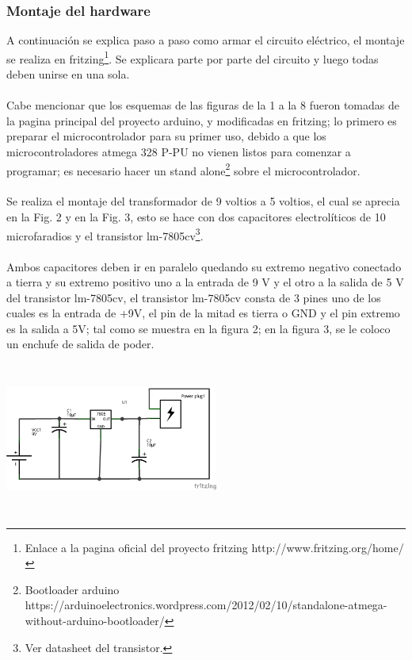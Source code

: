 \documentclass[12pt]{article}
\newenvironment{Figure}
{\par\medskip\noindent\minipage{\linewidth}}
{\endminipage\par\medskip}
\begin{document}
\begin{multicols}{2}
\subsubsection{Montaje del hardware}
A continuación se explica paso a paso como armar el circuito eléctrico, el montaje se realiza en fritzing\footnote{Enlace a la pagina oficial del proyecto fritzing http://www.fritzing.org/home/}. Se explicara parte por parte del circuito y luego todas deben unirse en una sola.
\\ \\
Cabe mencionar que los esquemas de las figuras de la 1 a la 8 fueron tomadas de la pagina principal del proyecto arduino, y modificadas en fritzing; lo primero es preparar el microcontrolador para su primer uso, debido a que los microcontroladores atmega 328 P-PU no vienen listos para comenzar a programar; es necesario hacer un stand alone\footnote{Bootloader arduino https://arduinoelectronics.wordpress.com/2012/02/10/standalone-atmega-without-arduino-bootloader/} sobre el microcontrolador.
\\ \\ 
Se realiza el montaje del transformador de 9 voltios a 5 voltios, el cual se aprecia en la Fig. 2 y en la Fig. 3, esto se hace con dos capacitores electrolíticos de 10 microfaradios  y el transistor lm-7805cv\footnote{ Ver datasheet del transistor.}.
\\ \\
Ambos  capacitores deben ir en paralelo quedando su extremo negativo conectado a tierra y su extremo positivo uno a la entrada de 9 V y el otro a la salida de 5 V del transistor lm-7805cv, el transistor lm-7805cv consta de 3 pines uno de los cuales es la entrada de +9V, el pin de la mitad es tierra o GND y el pin extremo es la salida a 5V; tal como se muestra en la figura 2; en la figura 3, se le coloco un enchufe de salida de poder.

\begin{Figure}
\center
\includegraphics[width=7cm, height=5cm]{fig/esquematrans.png} 
\label{fig:g2}
\end{Figure}
\vspace{0.2cm}


\end{multicols}
\end{document}
